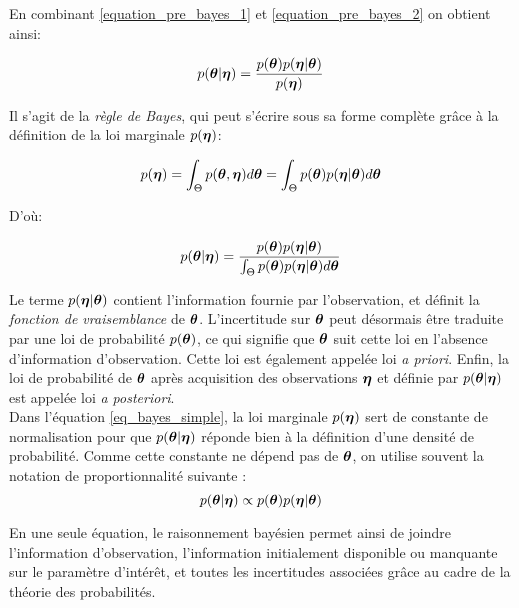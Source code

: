 En combinant \eqref{equation_pre_bayes_1} et \eqref{equation_pre_bayes_2} on obtient ainsi:

\begin{equation}
	p({\bm{\theta}} | {\bm{\eta}}) = \dfrac{p({\bm{\theta}})p({\bm{\eta}} | {\bm{\theta}})}{p({\bm{\eta}})}
	\label{eq_bayes_simple}
\end{equation}

Il s'agit de la \textit{règle de Bayes}, qui peut s'écrire sous sa forme complète grâce à la définition de la loi marginale $p({\bm{\eta}})$:

\begin{equation}
	p({\bm{\eta}}) = \int_{\Theta} p({\bm{\theta}},{\bm{\eta}})d{\bm{\theta}} = \int_{\Theta} p({\bm{\theta}})p({\bm{\eta}}|{\bm{\theta}})d{\bm{\theta}}
	\label{eq_definition_marginale_d}
\end{equation}
	

D'où:

\begin{equation}
	p({\bm{\theta}} | {\bm{\eta}}) = \dfrac{p({\bm{\theta}})p({\bm{\eta}} | {\bm{\theta}})}{ \int_{\Theta} p({\bm{\theta}})p({\bm{\eta}}|{\bm{\theta}})d{\bm{\theta}}}
	\label{eq_bayes_simple}
\end{equation}

Le terme $p({\bm{\eta}}|{\bm{\theta}})$ contient l'information fournie par l'observation, {et définit la \textit{fonction de vraisemblance} de ${\bm{\theta}}$.} 
L'incertitude sur ${\bm{\theta}}$ peut désormais être traduite par une loi de probabilité $p({\bm{\theta}})$, ce qui signifie que ${\bm{\theta}}$ suit cette loi en l'absence d'information d'observation. Cette loi est également appelée loi  \textit{a priori}. 
Enfin, la loi de probabilité de ${\bm{\theta}}$ après acquisition des observations ${\bm{\eta}}$ et définie par  	$p({\bm{\theta}} | {\bm{\eta}})$ est appelée loi \textit{a posteriori}.\\

Dans l'équation \eqref{eq_bayes_simple}, la loi marginale $p({\bm{\eta}})$ sert de constante de normalisation pour que $p({\bm{\theta}} | {\bm{\eta}})$ réponde bien à la définition d'une densité de probabilité. Comme cette constante ne dépend pas de ${\bm{\theta}}$, on utilise souvent la notation de proportionnalité suivante : 
\begin{equation}
	p({\bm{\theta}} | {\bm{\eta}}) \propto p({\bm{\theta}})p({\bm{\eta}} | {\bm{\theta}})
	\label{eq_bayes_proportionnalite}
\end{equation}

En une seule équation, le raisonnement bayésien permet ainsi de joindre l'information d'observation, l'information initialement disponible ou manquante sur le paramètre d'intérêt, et toutes les incertitudes associées grâce au cadre de la théorie des probabilités.

